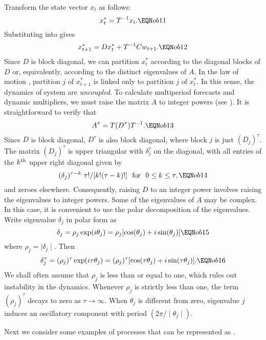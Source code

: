 Transform the state vector $x_t$ as follows:
$$ x_t^\ast = T^{-1} x_t . \EQN ob11 $$
Substituting into  gives
$$x_{t+1}^\ast = Dx_t^\ast + T^{-1} Cw_{t+1} . \EQN ob12 $$
Since $D$ is block diagonal, we can partition $x_t^\ast$ according to the
diagonal blocks of $D$ or, equivalently, according to the distinct eigenvalues
of $A$.  In the law of motion , partition $j$ of $x_{t+1}^\ast$
is linked only to partition $j$ of $x_t^\ast$.  In this sense, the dynamics
of system  are {\it uncoupled}.  To calculate multiperiod
forecasts and dynamic multipliers, we must raise the matrix $A$ to
integer powers (see ).  It is straightforward to verify that
$$ A^\tau = T(D^\tau)T^{-1} . \EQN ob13$$
Since $D$ is block diagonal, $D^\tau$ is also block diagonal, where block $j$
is just $(D_j)^\tau$.  The matrix $(D_j)^\tau$ is upper triangular with
$\delta_j^\tau$ on the diagonal, with all entries of the $k^{\rm th}$ upper
right diagonal given by
$$(\delta_j)^{\tau-k}\ \tau!/[k!(\tau-k)!] \ \hbox{ for } \ 0 \leq k \leq
\tau , \EQN ob14 $$
and zeroes elsewhere.  Consequently, raising $D$ to an integer power involves
raising the eigenvalues to integer powers.  Some of the eigenvalues of $A$ may
be complex.  In this case, it is convenient to use the polar decomposition of
the eigenvalues.  Write eigenvalue $\delta_j$ in polar form as
$$\delta_j = \rho_j \exp (i \theta_j) = \rho_j [\cos (\theta_j) + i \sin
(\theta_j)]  \EQN ob15 $$
where $\rho_j = \mid \delta_j \mid$.  Then
$$ \delta_j^\tau = ( \rho_j)^\tau \exp (i \tau \theta_j) = (\rho_j)^\tau
[\cos (\tau \theta_j) + i \sin (\tau \theta_j)] . \EQN ob16 $$
We shall often assume that $\rho_j$ is less than or equal to one, which rules
out instability in the dynamics.  Whenever $\rho_j$ is strictly less than one,
the term $(\rho_j)^\tau$ decays to zero as $\tau\to\infty$.  When $\theta_j$
is different from zero, eigenvalue $j$ induces an oscillatory component
with period $(2 \pi / \mid \theta_j \mid)$. %


Next we consider some examples of processes that can be represented as .

